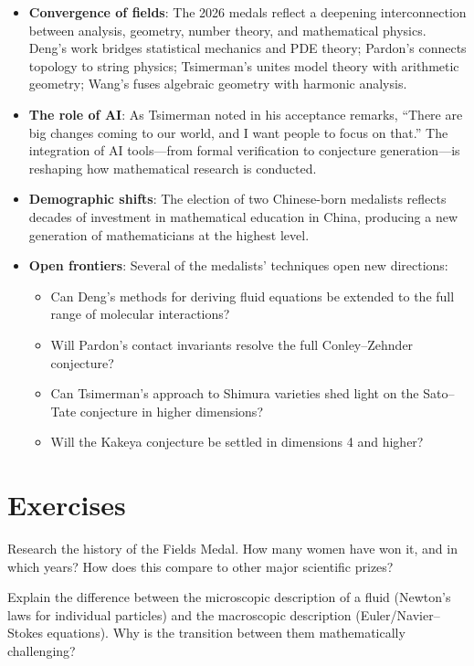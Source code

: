 \begin{itemize}
\item \textbf{Convergence of fields}: The 2026 medals reflect a deepening interconnection between analysis, geometry, number theory, and mathematical physics. Deng's work bridges statistical mechanics and PDE theory; Pardon's connects topology to string physics; Tsimerman's unites model theory with arithmetic geometry; Wang's fuses algebraic geometry with harmonic analysis.
\item \textbf{The role of AI}: As Tsimerman noted in his acceptance remarks, ``There are big changes coming to our world, and I want people to focus on that.'' The integration of AI tools---from formal verification to conjecture generation---is reshaping how mathematical research is conducted.
\item \textbf{Demographic shifts}: The election of two Chinese-born medalists reflects decades of investment in mathematical education in China, producing a new generation of mathematicians at the highest level.
\item \textbf{Open frontiers}: Several of the medalists' techniques open new directions:
  \begin{itemize}
  \item Can Deng's methods for deriving fluid equations be extended to the full range of molecular interactions?
  \item Will Pardon's contact invariants resolve the full Conley--Zehnder conjecture?
  \item Can Tsimerman's approach to Shimura varieties shed light on the Sato--Tate conjecture in higher dimensions?
  \item Will the Kakeya conjecture be settled in dimensions 4 and higher?
  \end{itemize}
\end{itemize}

\section{Exercises}

\begin{exercise}[Basic]
Research the history of the Fields Medal. How many women have won it, and in which years? How does this compare to other major scientific prizes?
\end{exercise}

\begin{exercise}[Intermediate]
Explain the difference between the microscopic description of a fluid (Newton's laws for individual particles) and the macroscopic description (Euler/Navier--Stokes equations). Why is the transition between them mathematically challenging?
\end{exercise}

